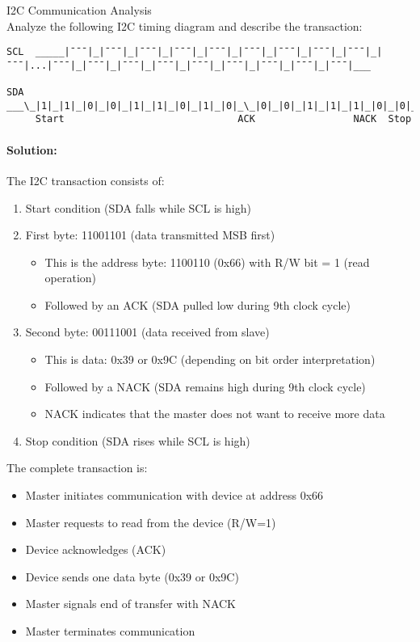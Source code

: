 \begin{example2}{I2C Communication Analysis}\\
Analyze the following I2C timing diagram and describe the transaction:

\begin{verbatim}
SCL  _____|¯¯¯|_|¯¯¯|_|¯¯¯|_|¯¯¯|_|¯¯¯|_|¯¯¯|_|¯¯¯|_|¯¯¯|_|¯¯¯|_|¯¯¯|...|¯¯¯|_|¯¯¯|_|¯¯¯|_|¯¯¯|_|¯¯¯|_|¯¯¯|_|¯¯¯|_|¯¯¯|_|¯¯¯|___
                     
SDA  ___\_|1|_|1|_|0|_|0|_|1|_|1|_|0|_|1|_|0|_\_|0|_|0|_|1|_|1|_|1|_|0|_|0|_|1|_/___
     Start                              ACK                 NACK  Stop
\end{verbatim}

\tcblower
\paragraph{Solution:}
The I2C transaction consists of:
\begin{enumerate}
    \item Start condition (SDA falls while SCL is high)
    \item First byte: 11001101 (data transmitted MSB first)
    \begin{itemize}
        \item This is the address byte: 1100110 (0x66) with R/W bit = 1 (read operation)
        \item Followed by an ACK (SDA pulled low during 9th clock cycle)
    \end{itemize}
    \item Second byte: 00111001 (data received from slave)
    \begin{itemize}
        \item This is data: 0x39 or 0x9C (depending on bit order interpretation)
        \item Followed by a NACK (SDA remains high during 9th clock cycle)
        \item NACK indicates that the master does not want to receive more data
    \end{itemize}
    \item Stop condition (SDA rises while SCL is high)
\end{enumerate}

The complete transaction is:
\begin{itemize}
    \item Master initiates communication with device at address 0x66
    \item Master requests to read from the device (R/W=1)
    \item Device acknowledges (ACK)
    \item Device sends one data byte (0x39 or 0x9C)
    \item Master signals end of transfer with NACK
    \item Master terminates communication
\end{itemize}
\end{example2}



